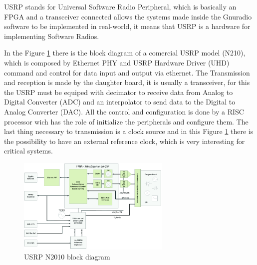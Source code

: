 

 USRP stands for Universal Software Radio Peripheral, which is basically an
FPGA and a transceiver connected allows the systems made inside the Gnuradio
software to be implemented in real-world, it means that USRP is a hardware for
implementing Software Radios.

In the Figure \ref{fig:usrpbd} there is the block diagram of a comercial USRP
model (N210), which is composed by Ethernet PHY and USRP Hardware Driver (UHD)
command and control for data input and output via ethernet. The Transmission and
reception is made by the daughter board, it is usually a transceiver, for this
the USRP must be equiped with  decimator to receive data from Analog to Digital
Converter (ADC) and an interpolator to send data to the Digital to Analog
Converter (DAC). All the control and configuration is done by a RISC processor
wich has the role of initialize the peripherals and configure them. The last
thing necessary to transmission is a clock source and in this Figure
\ref{fig:usrpbd} there is the possibility to have an external reference clock,
which is very interesting for critical systems.

\begin{figure}[htbp]
    \centering
    \includegraphics[width=0.65\textwidth]{./figures/usrp_bd}
    \caption{ USRP N2010 block diagram
    \label{fig:usrpbd}}
\end{figure}

